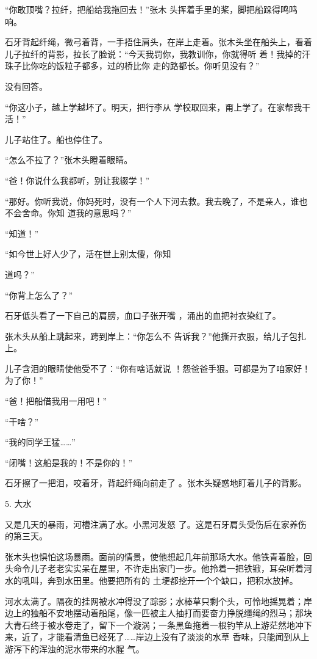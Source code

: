 \documentclass{article}
\begin{document}
“你敢顶嘴？拉纤，把船给我拖回去！”张木
头挥着手里的桨，脚把船跺得鸣鸣响。 

石牙背起纤绳，微弓着背，一手捂住肩头，在岸上走着。张木头坐在船头上，看着儿子拉纤的背影，拉长了脸说：“今天我罚你，我教训你，你就得听
\newpage
着！我掉的汗珠子比你吃的饭粒子都多，过的桥比你
走的路都长。你听见没有？” 


没有回答。 

“你这小子，越上学越坏了。明天，把行李从
学校取回来，甭上学了。在家帮我干活！” 


儿子站住了。船也停住了。 


“怎么不拉了？”张木头瞪着眼睛。 


“爸！你说什么我都听，别让我辍学！” 

“那好。你听我说，你妈死时，没有一个人下河去救。我去晚了，不是亲人，谁也不会舍命。你知
道我的意思吗？” 


“知道！” 

“如今世上好人少了，活在世上别太傻，你知
\newpage

道吗？” 



“你背上怎么了？” 

石牙低头看了一下自己的肩膀，血口子张开嘴
，涌出的血把衬衣染红了。 

张木头从船上跳起来，跨到岸上：“你怎么不
告诉我？”他撕开衣服，给儿子包扎上。 

儿子含泪的眼睛使他受不了：“你有啥话就说
！怨爸爸手狠。可都是为了咱家好！为了你！” 


“爸！把船借我用一用吧！” 


“干啥？” 


“我的同学王猛……” 


\newpage

“闭嘴！这船是我的！不是你的！” 

石牙擦了一把泪，咬着牙，背起纤绳向前走了
。张木头疑惑地盯着儿子的背影。 


5. 大水 

又是几天的暴雨，河槽注满了水。小黑河发怒
了。这是石牙肩头受伤后在家养伤的第三天。 

张木头也惧怕这场暴雨。面前的情景，使他想起几年前那场大水。他铁青着脸，回头命令儿子老老实实呆在屋里，不许走出家门一步。他拎着一把铁锨，耳朵听着河水的吼叫，奔到水田里。他要把所有的
土埂都挖开一个个缺口，把积水放掉。 

河水太满了。隔夜的挂网被水冲得没了踪影；水棒草只剩个头，可怜地摇晃着；岸边上的独船不安地摆动着船尾，像一匹被主人抽打而要奋力挣脱缰绳的烈马；那块大青石终于被水卷走了，留下一个漩涡；一条黑鱼拖着一根钓竿从上游茫然地冲下来，近了，才能看清鱼已经死了……岸边上没有了淡淡的水草
\newpage
香味，只能闻到从上游泻下的浑浊的泥水带来的水腥
气。 
\end{document}
